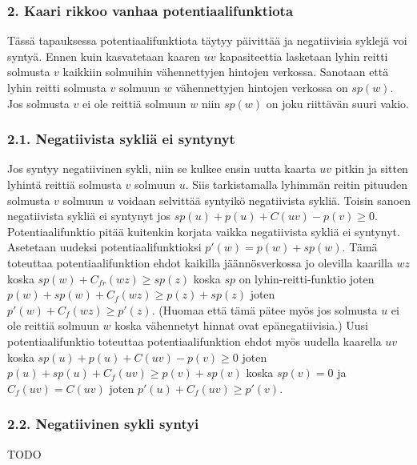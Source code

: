 \documentclass[a4paper, 11pt]{article}
\begin{document}
\subsubsection*{2. Kaari rikkoo vanhaa potentiaalifunktiota}
Tässä tapauksessa potentiaalifunktiota
täytyy päivittää ja negatiivisia syklejä voi syntyä. 
Ennen kuin kasvatetaan kaaren $uv$ kapasiteettia
lasketaan lyhin reitti solmusta $v$ kaikkiin solmuihin vähennettyjen hintojen verkossa.
Sanotaan että lyhin reitti solmusta $v$ solmuun $w$ vähennettyjen hintojen verkossa
on $sp(w)$. Jos solmusta $v$ ei ole reittiä solmuun $w$ niin $sp(w)$ on joku riittävän
suuri vakio.
\subsubsection*{2.1. Negatiivista sykliä ei syntynyt}
Jos syntyy negatiivinen sykli, niin se kulkee ensin uutta kaarta $uv$ pitkin ja sitten
lyhintä reittiä solmusta $v$ solmuun $u$. Siis tarkistamalla lyhimmän reitin pituuden solmusta
$v$ solmuun $u$ voidaan selvittää syntyikö negatiivista sykliä. Toisin sanoen negatiivista
sykliä ei syntynyt jos $sp(u) + p(u) + C(uv) - p(v) \ge 0$. Potentiaalifunktio
pitää kuitenkin korjata vaikka negatiivista sykliä ei syntynyt. Asetetaan uudeksi
potentiaalifunktioksi $p'(w) = p(w) + sp(w)$. Tämä toteuttaa
potentiaalifunktion ehdot kaikilla jäännösverkossa jo olevilla kaarilla $wz$ koska 
$sp(w) + C_{fr}(wz) \ge sp(z)$ koska $sp$ on lyhin-reitti-funktio
joten $p(w) + sp(w) + C_f(wz) \ge p(z) + sp(z)$ joten $p'(w) + C_f(wz) \ge p'(z)$.
(Huomaa että tämä pätee myös jos solmusta $u$ ei ole reittiä solmuun $w$ koska vähennetyt
hinnat ovat epänegatiivisia.) Uusi potentiaalifunktio toteuttaa potentiaalifunktion
ehdot myös uudella kaarella $uv$ koska $sp(u) + p(u) + C(uv) - p(v) \ge 0$ joten
$p(u) + sp(u) + C_f(uv) \ge p(v) + sp(v)$ koska $sp(v) = 0$ ja $C_f(uv) = C(uv)$
joten $p'(u) + C_f(uv) \ge p'(v)$.
\subsubsection*{2.2. Negatiivinen sykli syntyi}
TODO
\end{document}
